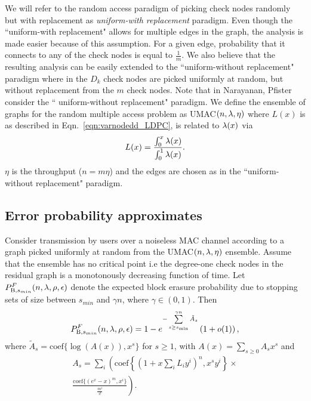 We will refer to the random access paradigm of picking check nodes randomly but with replacement as \textit{uniform-with replacement} paradigm. Even though the ``uniform-with replacement" allows for multiple edges in the graph, the analysis is made easier because of this assumption. For a given edge, probability that it connects to any of the check nodes is equal to $\frac{1}{m}$. We also believe that the resulting analysis can be easily extended to the ``uniform-without replacement" paradigm where in the $D_{k}$ check nodes are picked uniformly at random, but without replacement from the $m$ check nodes. Note that in Narayanan, Pfister \cite{narayanan2012iterative} consider the `` uniform-without replacement" paradigm. We define the ensemble of graphs for the random multiple access problem as UMAC$(n,\lambda,\eta)$ where $L(x)$ is as described in Eqn.~\eqref{eqn:varnodedd_LDPC}, is related to $\lambda(x)$ via
\begin{align*}
L(x)=\frac{\int_{0}^{x}\lambda(x)}{\int_{0}^{1}\lambda(x)}.
\end{align*}
 $\eta$ is the throughput ($n=m\eta$) and the edges are chosen as in the ``uniform-without replacement" paradigm.

\subsection{Error probability approximates}
\label{sec:UMACapproximate}
\begin{theorem}
Consider transmission by users over a noiseless MAC channel according to a graph picked uniformly at random from the UMAC$(n,\lambda,\eta)$ ensemble. Assume that the ensemble has no critical point i.e the degree-one check nodes in the residual graph is a monotonously decreasing function of time. Let $P_{\text{B},s_{min}}^{F}(n,\lambda,\rho,\epsilon)$ denote the expected block erasure probability due to stopping sets of size between $s_{min}$ and  $\gamma n$, where $\gamma\in (0,1)$. Then
\begin{align}
P_{\text{B},s_{min}}^{F}(n,\lambda,\rho,\epsilon)=1-e^{-\sum\limits_{s\geq s_{\text{min}}}^{\gamma n}\tilde{A}_{s}}\left(1+o(1)\right),
\label{Eqn:PBAnalytic}
\end{align}
where $\tilde{A}_{s}=\text{coef}\{\log(A(x)),x^s\}$ for $s\geq 1$, with $A(x)=\sum_{s\geq 0} A_{s}x^s$ and
\begin{multline}\label{Eqn:AvgSS}
A_{s}=\sum_{i}\left(\text{coef}\left\lbrace (1+x\sum_{i}L_{i}y^{i})^{n}, x^{s}y^{i} \right\rbrace \right.\times \\
\left.\frac{\text{coef}\lbrace (e^x -x)^{m},x^{i}\rbrace }{\frac{m^i}{i!}}\right). \\
\end{multline}
\label{Thm:UMACFloor}
\end{theorem}

